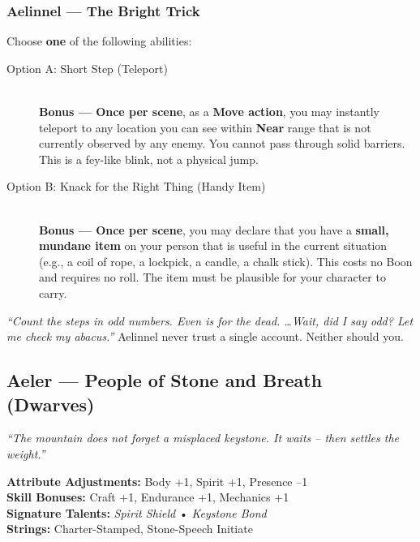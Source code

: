 \subsubsection{Aelinnel --- The Bright Trick}
\label{sec:aelinnel-racial-detailed}
Choose \textbf{one} of the following abilities:

\begin{description}
  \item[Option A: Short Step (Teleport)] \hfill \\
  \textbf{Bonus --- Once per scene}, as a \textbf{Move action}, you may instantly teleport to any location you can see within \textbf{Near} range that is not currently observed by any enemy. You cannot pass through solid barriers. This is a fey-like blink, not a physical jump.
  
  \item[Option B: Knack for the Right Thing (Handy Item)] \hfill \\
  \textbf{Bonus --- Once per scene}, you may declare that you have a \textbf{small, mundane item} on your person that is useful in the current situation (e.g., a coil of rope, a lockpick, a candle, a chalk stick). This costs no Boon and requires no roll. The item must be plausible for your character to carry.
\end{description}

\begin{tcolorbox}[colback=cyan!5!white,colframe=cyan!70!black,title=A Gnomish Maxim,breakable]
\emph{``Count the steps in odd numbers. Even is for the dead. \dots Wait, did I say odd? Let me check my abacus.''}  
Aelinnel never trust a single account. Neither should you.
\end{tcolorbox}

\clearpage

\subsection{Aeler --- People of Stone and Breath (Dwarves)}
\label{sec:aeler-detailed}

\emph{``The mountain does not forget a misplaced keystone. It waits -- then settles the weight.''}

\begin{tcolorbox}[colback=black!3!white,colframe=black!40!white,title=Aeler at a Glance,breakable]
\textbf{Attribute Adjustments:} Body +1, Spirit +1, Presence --1 \\
\textbf{Skill Bonuses:} Craft +1, Endurance +1, Mechanics +1 \\
\textbf{Signature Talents:} \emph{Spirit Shield} • \emph{Keystone Bond} \\
\textbf{Strings:} Charter-Stamped, Stone-Speech Initiate
\end{tcolorbox}

